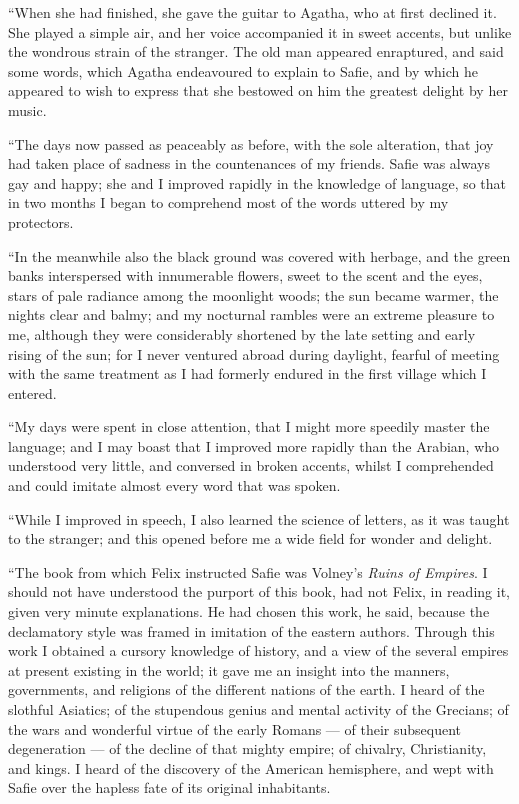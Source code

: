 ``When she had finished, she gave the
guitar to Agatha, who at first declined
it. She played a simple air, and her
voice accompanied it in sweet accents,
but unlike the wondrous strain of the
stranger. The old man appeared enraptured,
and said some words, which
Agatha endeavoured to explain to Safie,
and by which he appeared to wish to
express that she bestowed on him the
greatest delight by her music.

``The days now passed as peaceably as
before, with the sole alteration, that joy
had taken place of sadness in the countenances
of my friends. Safie was always
gay and happy; she and I improved
rapidly in the knowledge of
language, so that in two months I began
to comprehend most of the words
uttered by my protectors.

``In the meanwhile also the black
ground was covered with herbage, and
the green banks interspersed with innumerable
flowers, sweet to the scent
and the eyes, stars of pale radiance
among the moonlight woods; the sun
became warmer, the nights clear and
balmy; and my nocturnal rambles were
an extreme pleasure to me, although
they were considerably shortened by the
late setting and early rising of the sun;
for I never ventured abroad during daylight,
fearful of meeting with the same
treatment as I had formerly endured in
the first village which I entered.

``My days were spent in close attention,
that I might more speedily master
the language; and I may boast that I
improved more rapidly than the Arabian,
who understood very little, and
conversed in broken accents, whilst I
comprehended and could imitate almost
every word that was spoken.

``While I improved in speech, I also
learned the science of letters, as it was
taught to the stranger; and this opened
before me a wide field for wonder and
delight.

``The book from which Felix instructed
Safie was Volney's \emph{Ruins of Empires}.
I should not have understood the purport
of this book, had not Felix, in reading
it, given very minute explanations.
He had chosen this work, he said, because
the declamatory style was framed
in imitation of the eastern authors.
Through this work I obtained a cursory
knowledge of history, and a view of
the several empires at present existing
in the world; it gave me an insight into
the manners, governments, and religions
of the different nations of the
earth. I heard of the slothful Asiatics;
of the stupendous genius and mental activity
of the Grecians; of the wars and
wonderful virtue of the early Romans --- of
their subsequent degeneration --- of the
decline of that mighty empire; of chivalry,
Christianity, and kings. I heard
of the discovery of the American hemisphere,
and wept with Safie over the
hapless fate of its original inhabitants.

